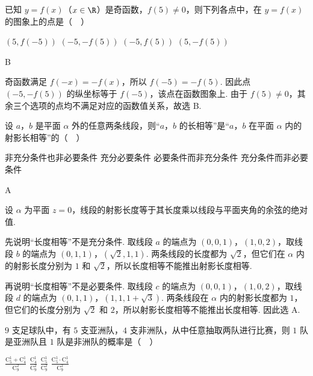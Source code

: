 \documentclass[UTF8,a4paper,oneside,11pt]{ctexbook}
\begin{document}
\begin{problem}
已知 \(y = f(x)\)（\(x \in \R\)）是奇函数，\(f(5) \neq 0\)，则下列各点中，在 \(y = f(x)\) 的图象上的点是（\(\quad\)）

\choices
    {\((5, f(-5))\)}
    {\((-5, -f(5))\)}
    {\((-5, f(5))\)}
    {\((5, -f(5))\)}
\end{problem}

\begin{answer}
B
\end{answer}

\begin{solution}
奇函数满足 \(f(-x)=-f(x)\)，所以 \(f(-5)=-f(5)\). 因此点 \((-5,-f(5))\) 的纵坐标等于 \(f(-5)\)，该点在函数图象上. 由于 \(f(5)\ne0\)，其余三个选项的点均不满足对应的函数值关系，故选 B.
\end{solution}

\begin{problem}
设 \(a\)，\(b\) 是平面 \(\alpha\) 外的任意两条线段，则“\(a\)，\(b\) 的长相等”是“\(a\)，\(b\) 在平面 \(\alpha\) 内的射影长相等”的（\(\quad\)）

\choices
    {非充分条件也非必要条件}
    {充分必要条件}
    {必要条件而非充分条件}
    {充分条件而非必要条件}
\end{problem}

\begin{answer}
A
\end{answer}

\begin{solution}
设 \(\alpha\) 为平面 \(z=0\)，线段的射影长度等于其长度乘以线段与平面夹角的余弦的绝对值.

先说明“长度相等”不是充分条件. 取线段 \(a\) 的端点为 \((0,0,1)\)，\((1,0,2)\)，取线段 \(b\) 的端点为 \((0,1,1)\)，\((\sqrt{2},1,1)\). 两条线段的长度都为 \(\sqrt{2}\)，但它们在 \(\alpha\) 内的射影长度分别为 \(1\) 和 \(\sqrt{2}\)，所以长度相等不能推出射影长度相等.

再说明“长度相等”不是必要条件. 取线段 \(c\) 的端点为 \((0,0,1)\)，\((1,0,2)\)，取线段 \(d\) 的端点为 \((0,1,1)\)，\((1,1,1+\sqrt{3})\). 两条线段在 \(\alpha\) 内的射影长度都为 \(1\)，但它们的长度分别为 \(\sqrt{2}\) 和 \(2\)，所以射影长度相等不能推出长度相等. 因此选 A.
\end{solution}

\begin{problem}
\(9\) 支足球队中，有 \(5\) 支亚洲队，\(4\) 支非洲队，从中任意抽取两队进行比赛，则 \(1\) 队是亚洲队且 \(1\) 队是非洲队的概率是（\(\quad\)）

\choices
    {\(\frac{\mathrm C_5^1 + \mathrm C_4^1}{\mathrm C_9^2}\)}
    {\(\frac{\mathrm C_4^1}{\mathrm C_9^2}\)}
    {\(\frac{\mathrm C_5^1}{\mathrm C_9^2}\)}
    {\(\frac{\mathrm C_5^1 \cdot \mathrm C_4^1}{\mathrm C_9^2}\)}
\end{problem}
\end{document}
